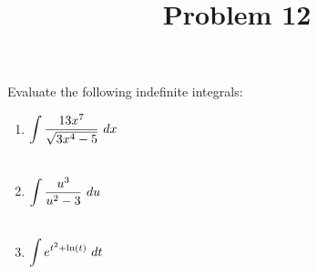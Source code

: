 \documentclass{ximera}
\title[Problem 12]{Problem 12}
\begin{document}
\begin{abstract} \end{abstract}
\maketitle

\begin{problem}
	Evaluate the following indefinite integrals:
	\begin{enumerate}
		
		\item $\displaystyle \int \dfrac{13x^7}{\sqrt{3x^4-5}} \, \,d x$\\ \\
\item $\displaystyle \int \dfrac{u^3}{u^2-3} \, \,d u$\\ \\
\item $\displaystyle \int e^{t^2+\ln(t)} \, \,d t$\\ \\
\end{enumerate}
\end{problem}
\end{document}
